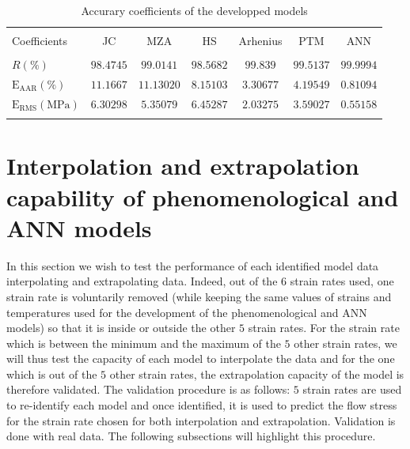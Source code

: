 \documentclass[twoside,english,1p,final,sort&compress]{elsarticle}
\theoremstyle{plain}
\newcommand{\RMSE}{\text{E}_\text{RMS}}
\newcommand{\AARE}{\text{E}_\text{AAR}}
\begin{document}
\begin{table}[h!]
\centering{}
\caption{Accurary coefficients of the developped models}
\begin{tabular}{lcccccc}
\hline
&		&		&         &             &		   &		  		\\
Coefficients&JC  & MZA  &HS  & Arhenius      & PTM  &ANN  		    \\
&				&				&         &             &		   &\\
\hline
$R(\%)$&$98.4745$&$99.0141$&$98.5682$&$99.839$& $99.5137$&$99.9994$ \\
$\AARE(\%)$&$11.1667$&$11.13020$&$8.15103$&$3.30677$&$4.19549$&$0.81094$   \\
$\RMSE(\text{MPa})$&$6.30298$&$5.35079$&$6.45287$&$2.03275$&$3.59027$&$0.55158$\\
\hline
\label{tab:Coefsparams}
\end{tabular}
\end{table}

\section{Interpolation and extrapolation capability of phenomenological and ANN models \label{sec:inExtrapolation}}
In this section we wish to test the performance of each identified model data interpolating and extrapolating data.
Indeed, out of the $6$ strain rates used, one strain rate is voluntarily removed (while keeping the same values of strains and temperatures used for the development of the phenomenological and ANN models) so that it is inside or outside the other $5$ strain rates.
For the strain rate which is between the minimum and the maximum of the $5$ other strain rates, we will thus test the capacity of each model to interpolate the data and for the one which is out of the $5$ other strain rates, the extrapolation capacity of the model is therefore validated.
The validation procedure is as follows: $5$ strain rates are used to re-identify each model and once identified, it is used to predict the flow stress for the strain rate chosen for both interpolation and extrapolation.
Validation is done with real data.
The following subsections will highlight this procedure.
\end{document}
